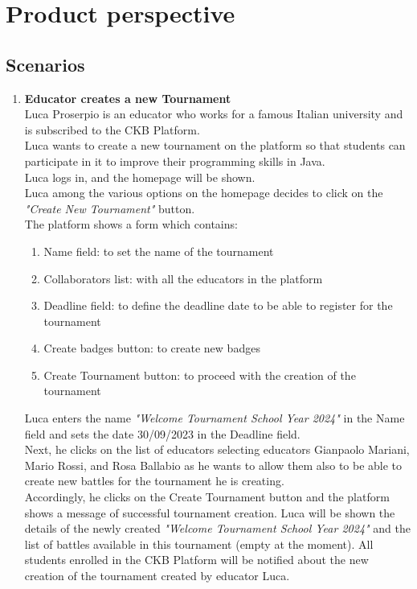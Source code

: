 \section{Product perspective}
\subsection{Scenarios}

\begin{enumerate}
	\item \textbf{Educator creates a new Tournament}\\
	      Luca Proserpio is an educator who works for a famous Italian university and is subscribed to the CKB Platform.\\
	      Luca wants to create a new tournament on the platform so that students can participate in it to improve their programming skills in Java.\\
	      Luca logs in, and the homepage will be shown.\\
	      Luca among the various options on the homepage decides to click on the \emph{"Create New Tournament"} button. \\
	      The platform shows a form which contains:

	      \begin{enumerate}
		      \item Name field: to set the name of the tournament
		      \item Collaborators list: with all the educators in the platform
		      \item Deadline field: to define the deadline date to be able to register for the tournament
		      \item Create badges button: to create new badges
		      \item Create Tournament button: to proceed with the creation of the tournament
	      \end{enumerate}

	      Luca enters the name \emph{"Welcome Tournament School Year 2024"} in the Name field and sets the date 30/09/2023 in the Deadline field.\\
	      Next, he clicks on the list of educators selecting educators Gianpaolo Mariani, Mario Rossi, and Rosa Ballabio as he wants to allow them also to be able to create new
	      battles for the tournament he is creating.\\
	      Accordingly, he clicks on the Create Tournament button and the platform shows a message of successful tournament creation.
	      Luca will be shown the details of the newly created \emph{"Welcome Tournament School Year 2024"} and the list of battles available in this tournament (empty at the moment).
	      All students enrolled in the CKB Platform will be notified about the new creation of the tournament created by educator Luca.


\end{enumerate}

